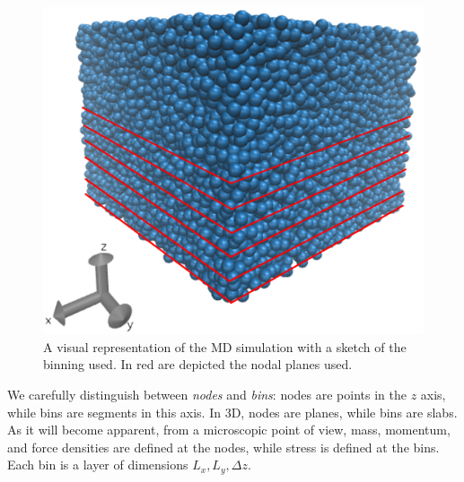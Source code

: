 \documentclass[b5paper,openright,11pt]{book}
\begin{document}
\begin{figure}
    \centering
    \includegraphics[scale=0.3]{system_nodes_periodic}
    \caption[Periodic box]{A visual representation of the MD simulation with a sketch of the binning used. In red are depicted the nodal planes used.}
    \label{fig:PBCBox}
\end{figure}
We carefully  distinguish between  \textit{nodes} and
\textit{bins}:  nodes are  points  in  the $z$  axis,  while bins  are
segments in this axis.  In 3D, nodes are planes, while bins are slabs.
As it  will become apparent, from  a microscopic point of  view, mass,
momentum, and force  densities are defined at the  nodes, while stress
is  defined  at  the  bins.   Each   bin  is  a  layer  of  dimensions
$L_x,L_y,\Delta z$. 
\end{document}
